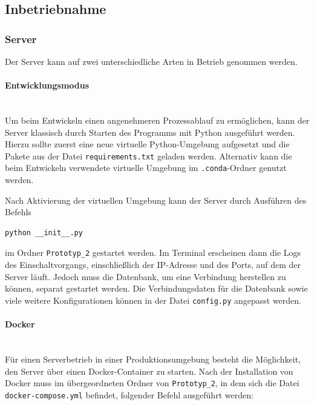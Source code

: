 \newpage

\subsection{Inbetriebnahme}

\subsubsection{Server}

Der Server kann auf zwei unterschiedliche Arten in Betrieb genommen werden.  

\paragraph{Entwicklungsmodus} \mbox{}\\ 

Um beim Entwickeln einen angenehmeren Prozessablauf zu ermöglichen, kann der Server klassisch durch Starten des Programms mit Python ausgeführt werden.  
Hierzu sollte zuerst eine neue virtuelle Python-Umgebung aufgesetzt und die Pakete aus der Datei \texttt{requirements.txt} geladen werden. Alternativ kann die beim Entwickeln verwendete virtuelle Umgebung im \texttt{.conda}-Ordner genutzt werden.  

Nach Aktivierung der virtuellen Umgebung kann der Server durch Ausführen des Befehls  
\begin{verbatim}
python __init__.py
\end{verbatim}  
im Ordner \texttt{Prototyp\_2} gestartet werden.  
Im Terminal erscheinen dann die Logs des Einschaltvorgangs, einschließlich der IP-Adresse und des Ports, auf dem der Server läuft.  
Jedoch muss die Datenbank, um eine Verbindung herstellen zu können, separat gestartet werden.  
Die Verbindungsdaten für die Datenbank sowie viele weitere Konfigurationen können in der Datei \texttt{config.py} angepasst werden.  

\paragraph{Docker} \mbox{}\\

Für einen Serverbetrieb in einer Produktionsumgebung besteht die Möglichkeit, den Server über einen Docker-Container zu starten.  
Nach der Installation von Docker muss im übergeordneten Ordner von \texttt{Prototyp\_2}, in dem sich die Datei \texttt{docker-compose.yml} befindet, folgender Befehl ausgeführt werden:  

